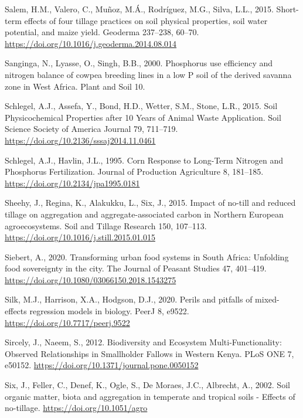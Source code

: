 \documentclass[
  12pt,
]{article}
\newlength{\cslhangindent}
\newlength{\cslentryspacingunit} %
\newenvironment{CSLReferences}[2] %
 {%
  \setlength{\parindent}{0pt}
  \ifodd #1
  \let\oldpar\par
  \def\par{\hangindent=\cslhangindent\oldpar}
  \fi
  \setlength{\parskip}{#2\cslentryspacingunit}
 }%
 {}
\begin{document}
\begin{CSLReferences}{1}{0}
\leavevmode{}%
Salem, H.M., Valero, C., Muñoz, M.Á., Rodríguez, M.G., Silva, L.L., 2015. Short-term effects of four tillage practices on soil physical properties, soil water potential, and maize yield. Geoderma 237--238, 60--70. \url{https://doi.org/10.1016/j.geoderma.2014.08.014}

\leavevmode{}%
Sanginga, N., Lyasse, O., Singh, B.B., 2000. Phosphorus use efficiency and nitrogen balance of cowpea breeding lines in a low {P} soil of the derived savanna zone in {West Africa}. Plant and Soil 10.

\leavevmode{}%
Schlegel, A.J., Assefa, Y., Bond, H.D., Wetter, S.M., Stone, L.R., 2015. Soil {Physicochemical Properties} after 10 {Years} of {Animal Waste Application}. Soil Science Society of America Journal 79, 711--719. \url{https://doi.org/10.2136/sssaj2014.11.0461}

\leavevmode{}%
Schlegel, A.J., Havlin, J.L., 1995. Corn {Response} to {Long-Term Nitrogen} and {Phosphorus Fertilization}. Journal of Production Agriculture 8, 181--185. \url{https://doi.org/10.2134/jpa1995.0181}

\leavevmode{}%
Sheehy, J., Regina, K., Alakukku, L., Six, J., 2015. Impact of no-till and reduced tillage on aggregation and aggregate-associated carbon in {Northern European} agroecosystems. Soil and Tillage Research 150, 107--113. \url{https://doi.org/10.1016/j.still.2015.01.015}

\leavevmode{}%
Siebert, A., 2020. Transforming urban food systems in {South Africa}: Unfolding food sovereignty in the city. The Journal of Peasant Studies 47, 401--419. \url{https://doi.org/10.1080/03066150.2018.1543275}

\leavevmode{}%
Silk, M.J., Harrison, X.A., Hodgson, D.J., 2020. Perils and pitfalls of mixed-effects regression models in biology. PeerJ 8, e9522. \url{https://doi.org/10.7717/peerj.9522}

\leavevmode{}%
Sircely, J., Naeem, S., 2012. Biodiversity and {Ecosystem Multi-Functionality}: {Observed Relationships} in {Smallholder Fallows} in {Western Kenya}. PLoS ONE 7, e50152. \url{https://doi.org/10.1371/journal.pone.0050152}

\leavevmode{}%
Six, J., Feller, C., Denef, K., Ogle, S., De Moraes, J.C., Albrecht, A., 2002. Soil organic matter, biota and aggregation in temperate and tropical soils - {Effects} of no-tillage. \url{https://doi.org/10.1051/agro}


\end{CSLReferences}
\end{document}
